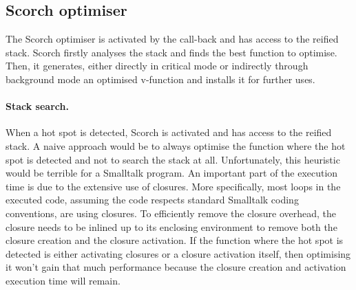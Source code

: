 \documentclass[a4paper,12pt,twoside]{../includes/ThesisStyle}
\begin{document}



\subsection{Scorch optimiser}

The Scorch optimiser is activated by the call-back and has access to the reified stack. Scorch firstly analyses the stack and finds the best function to optimise. Then, it generates, either directly in critical mode or indirectly through background mode an optimised v-function and installs it for further uses.


\paragraph{Stack search.}
\label{ss:stackSearch}

When a hot spot is detected, Scorch is activated and has access to the reified stack. A naive approach would be to always optimise the function where the hot spot is detected and not to search the stack at all. Unfortunately, this heuristic would be terrible for a Smalltalk program. An important part of the execution time is due to the extensive use of closures. More specifically, most loops in the executed code, assuming the code respects standard Smalltalk coding conventions, are using closures. To efficiently remove the closure overhead, the closure needs to be inlined up to its enclosing environment to remove both the closure creation and the closure activation. If the function where the hot spot is detected is either activating closures or a closure activation itself, then optimising it won't gain that much performance because the closure creation and activation execution time will remain.
\end{document}
